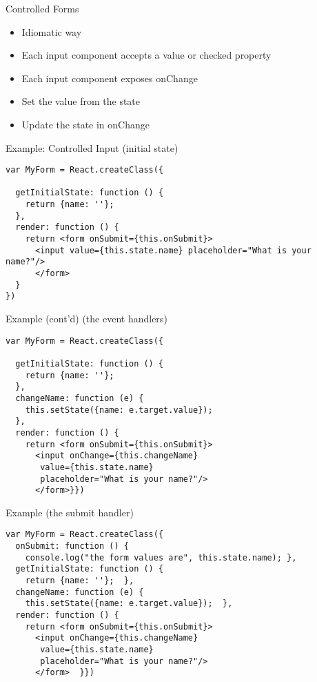 \documentclass[presentation]{beamer}
\begin{document}
\begin{frame}[label={sec:orgheadline8}]{Controlled Forms}
\begin{itemize}
\item Idiomatic way
\item Each input component accepts a value or checked property
\item Each input component exposes onChange
\item Set the value from the state
\item Update the state in onChange
\end{itemize}
\end{frame}

\begin{frame}[fragile,label={sec:orgheadline9}]{Example: Controlled Input (initial state)}
 \begin{verbatim}
var MyForm = React.createClass({

  getInitialState: function () {
    return {name: ''};
  },
  render: function () {
    return <form onSubmit={this.onSubmit}>
      <input value={this.state.name} placeholder="What is your name?"/>
      </form>
  }
})
\end{verbatim}
\end{frame}

\begin{frame}[fragile,label={sec:orgheadline10}]{Example (cont'd) (the event handlers)}
 \begin{verbatim}
var MyForm = React.createClass({

  getInitialState: function () {
    return {name: ''};
  },
  changeName: function (e) {
    this.setState({name: e.target.value});
  },
  render: function () {
    return <form onSubmit={this.onSubmit}>
      <input onChange={this.changeName}
       value={this.state.name}
       placeholder="What is your name?"/>
      </form>}})
\end{verbatim}
\end{frame}

\begin{frame}[fragile,label={sec:orgheadline11}]{Example (the submit handler)}
 \begin{verbatim}
var MyForm = React.createClass({
  onSubmit: function () {
    console.log("the form values are", this.state.name); },
  getInitialState: function () {
    return {name: ''};  },
  changeName: function (e) {
    this.setState({name: e.target.value});  },
  render: function () {
    return <form onSubmit={this.onSubmit}>
      <input onChange={this.changeName}
       value={this.state.name}
       placeholder="What is your name?"/>
      </form>  }})
\end{verbatim}
\end{frame}
\end{document}
